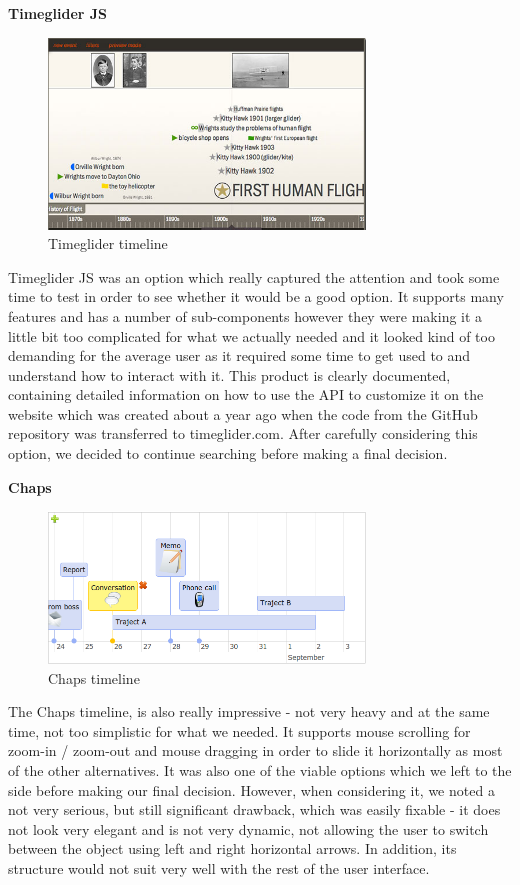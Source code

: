 \documentclass{l3proj}
\begin{document}
\textbf{Timeglider JS}

\begin{figure}[ht!]
  \centering
\includegraphics[width=0.75\textwidth]{images/Timeglider.png}
\caption{Timeglider timeline}
\end{figure}

Timeglider JS was an option which really captured the attention and took some time to test in order to see whether it would be a good option. It supports many features and has a number of sub-components however they were making it a little bit too complicated for what we actually needed and it looked kind of too demanding for the average user as it required some time to get used to and understand how to interact with it. This product is clearly documented, containing detailed information on how to use the API to customize it on the website which was created about a year ago when the code from the GitHub repository was transferred to timeglider.com. After carefully considering this option, we decided to continue searching before making a final decision.


\textbf{Chaps}

\begin{figure}[ht!]
  \centering
\includegraphics[width=0.75\textwidth]{images/Chaps.png}
\caption{Chaps timeline}
\end{figure}

The Chaps timeline, is also really impressive - not very heavy and at the same time, not too simplistic for what we needed. It supports mouse scrolling for zoom-in / zoom-out and mouse dragging in order to slide it horizontally as most of the other alternatives. It was also one of the viable options which we left to the side before making our final decision. However, when considering it, we noted a not very serious, but still significant drawback, which was easily fixable - it does not look very elegant and is not very dynamic, not allowing the user to switch between the object using left and right horizontal arrows. In addition, its structure would not suit very well with the rest of the user interface.
\end{document}
